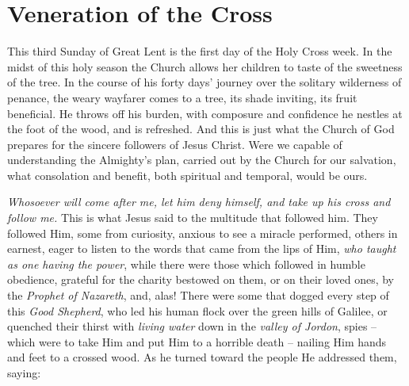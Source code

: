\chapter{Veneration of the Cross}


This third Sunday of Great Lent is the first 
day of the Holy Cross week. In the midst 
of this holy season the Church allows her children
to taste of the sweetness of the tree. In 
the course of his forty days' journey over the 
solitary wilderness of penance, the weary wayfarer
comes to a tree, its shade inviting, its fruit 
beneficial. He throws off his burden, with composure
and confidence he nestles at the foot of 
the wood, and is refreshed. And this is just 
what the Church of God prepares for the sincere
followers of Jesus Christ. Were we capable 
of understanding the Almighty's plan, carried 
out by the Church for our salvation, what consolation
and benefit, both spiritual and temporal,
would be ours. 

\textit{Whosoever will come after me, let him deny 
himself, and take up his cross and follow me.}
This is what Jesus said to the multitude that
followed him. They followed Him, some from 
curiosity, anxious to see a miracle performed, 
others in earnest, eager to listen to the words 
that came from the lips of Him, \textit{who taught as 
one having the power}, while there were those 
which followed in humble obedience, grateful 
for the charity bestowed on them, or on their 
loved ones, by the \textit{Prophet of Nazareth}, and, 
alas! There were some that dogged every step of 
this \textit{Good Shepherd}, who led his human flock 
over the green hills of Galilee, or quenched 
their thirst with \textit{living water} down in the \textit{valley 
of Jordon}, spies -- which were to take Him and 
put Him to a horrible death -- nailing Him hands 
and feet to a crossed wood. As he turned toward
the people He addressed them, saying: 

